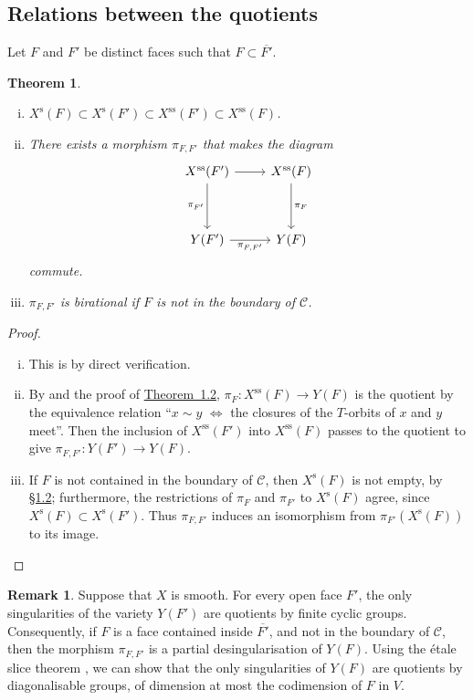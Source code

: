 \documentclass{article}
\theoremstyle{plain}
\newtheorem*{theorem}{Theorem}
\theoremstyle{definition}
\newtheorem*{remark}{Remark}
\newcommand{\s}{\mathrm{s}}
\renewcommand{\ss}{\mathrm{ss}}
\newcommand{\oldpage}[1]{\marginpar{\footnotesize$\Big\vert$ \textit{p.~#1}}}
\begin{document}
\subsection{Relations between the quotients}
\label{1.4}

Let $F$ and $F'$ be distinct faces such that $F\subset\overline{F'}$.

\begin{theorem}
  \begin{enumerate}[(i)]
    \item $X^\s(F) \subset X^\s(F') \subset X^\ss(F') \subset X^\ss(F)$.
    \item There exists a morphism $\pi_{F,F'}$ that makes the diagram
      \[
        \begin{tikzcd}[row sep=huge]
          X^\ss(F') \rar \dar[swap,"\pi_{F'}"]
          & X^\ss(F) \dar["\pi_F"]
        \\Y(F') \rar[swap,"\pi_{F,F'}"]
          & Y(F)
        \end{tikzcd}
      \]
      commute.
    \item $\pi_{F,F'}$ is birational if $F$ is not in the boundary of $\mathcal{C}$.
  \end{enumerate}
\end{theorem}

\oldpage{515}
\begin{proof}
  \begin{enumerate}[(i)]
    \item This is by direct verification.
    \item By \cite[1.11]{MF} and the proof of \hyperref[1.2-theorem]{Theorem~1.2}, $\pi_F\colon X^\ss(F)\to Y(F)$ is the quotient by the equivalence relation ``$x\sim y$ $\iff$ the closures of the $T$-orbits of $x$ and $y$ meet''.
      Then the inclusion of $X^\ss(F')$ into $X^\ss(F)$ passes to the quotient to give $\pi_{F,F'}\colon Y(F')\to Y(F)$.
    \item If $F$ is not contained in the boundary of $\mathcal{C}$, then $X^\s(F)$ is not empty, by \hyperref[1.2]{\S1.2};
      furthermore, the restrictions of $\pi_F$ and $\pi_{F'}$ to $X^\s(F)$ agree, since $X^\s(F)\subset X^\s(F')$.
      Thus $\pi_{F,F'}$ induces an isomorphism from $\pi_{F'}(X^\s(F))$ to its image.
  \end{enumerate}
\end{proof}

\begin{remark}
  Suppose that $X$ is smooth.
  For every open face $F'$, the only singularities of the variety $Y(F')$ are quotients by finite cyclic groups.
  Consequently, if $F$ is a face contained inside $\overline{F'}$, and not in the boundary of $\mathcal{C}$, then the morphism $\pi_{F,F'}$ is a partial desingularisation of $Y(F)$.
  Using the \'{e}tale slice theorem \cite[III.1]{Lun}, we can show that the only singularities of $Y(F)$ are quotients by diagonalisable groups, of dimension at most the codimension of $F$ in $V$.
\end{remark}
\end{document}
